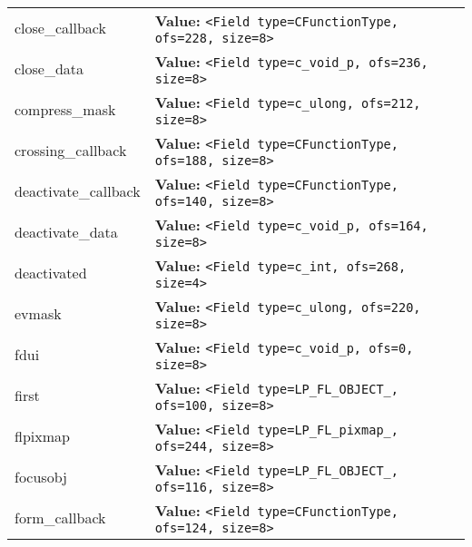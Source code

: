 \begin{longtable}{|p{\varnamewidth}|p{\vardescrwidth}|l}
\cline{1-2}
\raggedright c\-l\-o\-s\-e\-\_\-c\-a\-l\-l\-b\-a\-c\-k\- & \raggedright \textbf{Value:} 
{\tt {\textless}Field type=CFunctionType, ofs=228, size=8{\textgreater}}&\\
\cline{1-2}
\raggedright c\-l\-o\-s\-e\-\_\-d\-a\-t\-a\- & \raggedright \textbf{Value:} 
{\tt {\textless}Field type=c\_void\_p, ofs=236, size=8{\textgreater}}&\\
\cline{1-2}
\raggedright c\-o\-m\-p\-r\-e\-s\-s\-\_\-m\-a\-s\-k\- & \raggedright \textbf{Value:} 
{\tt {\textless}Field type=c\_ulong, ofs=212, size=8{\textgreater}}&\\
\cline{1-2}
\raggedright c\-r\-o\-s\-s\-i\-n\-g\-\_\-c\-a\-l\-l\-b\-a\-c\-k\- & \raggedright \textbf{Value:} 
{\tt {\textless}Field type=CFunctionType, ofs=188, size=8{\textgreater}}&\\
\cline{1-2}
\raggedright d\-e\-a\-c\-t\-i\-v\-a\-t\-e\-\_\-c\-a\-l\-l\-b\-a\-c\-k\- & \raggedright \textbf{Value:} 
{\tt {\textless}Field type=CFunctionType, ofs=140, size=8{\textgreater}}&\\
\cline{1-2}
\raggedright d\-e\-a\-c\-t\-i\-v\-a\-t\-e\-\_\-d\-a\-t\-a\- & \raggedright \textbf{Value:} 
{\tt {\textless}Field type=c\_void\_p, ofs=164, size=8{\textgreater}}&\\
\cline{1-2}
\raggedright d\-e\-a\-c\-t\-i\-v\-a\-t\-e\-d\- & \raggedright \textbf{Value:} 
{\tt {\textless}Field type=c\_int, ofs=268, size=4{\textgreater}}&\\
\cline{1-2}
\raggedright e\-v\-m\-a\-s\-k\- & \raggedright \textbf{Value:} 
{\tt {\textless}Field type=c\_ulong, ofs=220, size=8{\textgreater}}&\\
\cline{1-2}
\raggedright f\-d\-u\-i\- & \raggedright \textbf{Value:} 
{\tt {\textless}Field type=c\_void\_p, ofs=0, size=8{\textgreater}}&\\
\cline{1-2}
\raggedright f\-i\-r\-s\-t\- & \raggedright \textbf{Value:} 
{\tt {\textless}Field type=LP\_FL\_OBJECT\_, ofs=100, size=8{\textgreater}}&\\
\cline{1-2}
\raggedright f\-l\-p\-i\-x\-m\-a\-p\- & \raggedright \textbf{Value:} 
{\tt {\textless}Field type=LP\_FL\_pixmap\_, ofs=244, size=8{\textgreater}}&\\
\cline{1-2}
\raggedright f\-o\-c\-u\-s\-o\-b\-j\- & \raggedright \textbf{Value:} 
{\tt {\textless}Field type=LP\_FL\_OBJECT\_, ofs=116, size=8{\textgreater}}&\\
\cline{1-2}
\raggedright f\-o\-r\-m\-\_\-c\-a\-l\-l\-b\-a\-c\-k\- & \raggedright \textbf{Value:} 
{\tt {\textless}Field type=CFunctionType, ofs=124, size=8{\textgreater}}&\\

\end{longtable}
